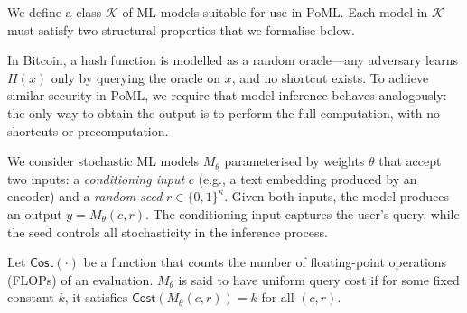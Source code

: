 We define a class $\mathcal{K}$ of ML models suitable for use in PoML. Each model in $\mathcal{K}$ must satisfy two structural properties that we formalise below.

In Bitcoin, a hash function is modelled as a random oracle---any adversary learns $H(x)$ only by querying the oracle on $x$, and no shortcut exists. To achieve similar security in PoML, we require that model inference behaves analogously: the only way to obtain the output is to perform the full computation, with no shortcuts or precomputation.

We consider stochastic ML models $M_\theta$ parameterised by weights $\theta$ that accept two inputs: a \emph{conditioning input} $c$ (e.g., a text embedding produced by an encoder) and a \emph{random seed} $r \in \{0,1\}^\kappa$. Given both inputs, the model produces an output $y = M_\theta(c, r)$. The conditioning input captures the user's query, while the seed controls all stochasticity in the inference process.


\begin{definition}
\label{def:uniform-cost}
Let $\mathsf{Cost}(\cdot)$ be a function that counts the number of floating-point operations (FLOPs) of an evaluation. $M_\theta$ is said to have uniform query cost if for some fixed constant $k$, it satisfies $\mathsf{Cost}(M_\theta(c,r)) = k$ for all $(c, r)$.
\end{definition}

